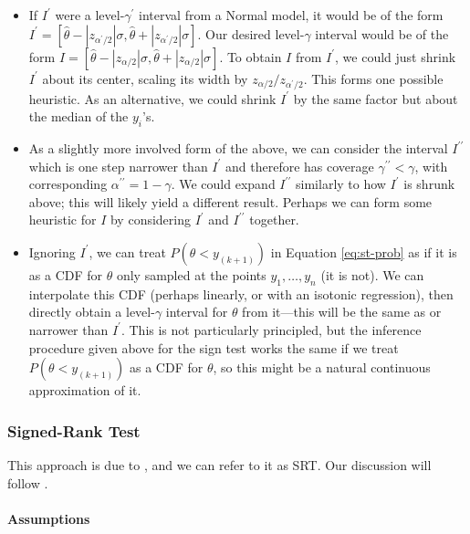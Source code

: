 \documentclass[letterpaper,12pt]{article}
\begin{document}
\begin{itemize}
  \item If $I^\prime$ were a level-$\gamma^\prime$ interval from a Normal model, it would be of the form $I^\prime=[\hat\theta-|z_{\alpha^\prime/2}|\sigma,\hat\theta+|z_{\alpha^\prime/2}|\sigma]$. Our desired level-$\gamma$ interval would be of the form $I=[\hat\theta-|z_{\alpha/2}|\sigma,\hat\theta+|z_{\alpha/2}|\sigma]$. To obtain $I$ from $I^\prime$, we could just shrink $I^\prime$ about its center, scaling its width by $z_{\alpha/2}/z_{\alpha^\prime/2}$. This forms one possible heuristic. As an alternative, we could shrink $I^\prime$ by the same factor but about the median of the $y_i$'s.
  \item As a slightly more involved form of the above, we can consider the interval $I^{\prime\prime}$ which is one step narrower than $I^\prime$ and therefore has coverage $\gamma^{\prime\prime}<\gamma$, with corresponding $\alpha^{\prime\prime}=1-\gamma$. We could expand $I^{\prime\prime}$ similarly to how $I^\prime$ is shrunk above; this will likely yield a different result. Perhaps we can form some heuristic for $I$ by considering $I^\prime$ and $I^{\prime\prime}$ together.
  \item Ignoring $I^\prime$, we can treat $P(\theta<y_{(k+1)})$ in Equation \ref{eq:st-prob} as if it is as a CDF for $\theta$ only sampled at the points $y_1,\ldots,y_n$ (it is not). We can interpolate this CDF (perhaps linearly, or with an isotonic regression), then directly obtain a level-$\gamma$ interval for $\theta$ from it---this will be the same as or narrower than $I^\prime$. This is not particularly principled, but the inference procedure given above for the sign test works the same if we treat $P(\theta<y_{(k+1)})$ as a CDF for $\theta$, so this might be a natural continuous approximation of it.
\end{itemize}

\subsubsection{Signed-Rank Test}\label{sec:srt}

This approach is due to \citet{wilcoxon1945individual}, and we can refer to it as SRT. Our discussion will follow \citet[Section 5.7]{conover1999practical}.

\paragraph{Assumptions}\label{assumptions-4}
\end{document}
